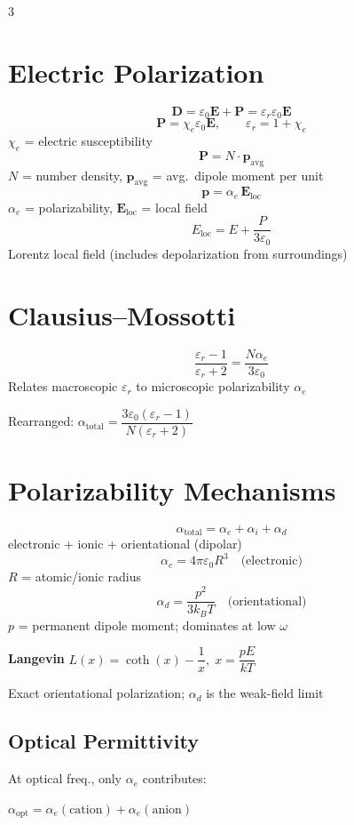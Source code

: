 \documentclass[9pt]{extarticle}
\newcommand{\eqlabel}[1]{\textbf{\scriptsize #1}\;}
\newcommand{\vardef}[1]{{\footnotesize\color{defgray}#1}}
\begin{document}
\begin{multicols}{3}

\section{Electric Polarization}
\[\mathbf{D} = \varepsilon_0\mathbf{E} + \mathbf{P} = \varepsilon_r\varepsilon_0\mathbf{E}\]
\[\mathbf{P} = \chi_e\varepsilon_0\mathbf{E},\qquad \varepsilon_r = 1 + \chi_e\]
\vardef{$\chi_e$ = electric susceptibility}
\[\mathbf{P} = N\cdot\mathbf{p}_{\text{avg}}\]
\vardef{$N$ = number density, $\mathbf{p}_{\text{avg}}$ = avg.\ dipole moment per unit}
\[\mathbf{p} = \alpha_e\,\mathbf{E}_{\text{loc}}\]
\vardef{$\alpha_e$ = polarizability, $\mathbf{E}_{\text{loc}}$ = local field}
\[E_{\text{loc}} = E + \frac{P}{3\varepsilon_0}\]
\vardef{Lorentz local field (includes depolarization from surroundings)}

\section{Clausius--Mossotti}
\[\frac{\varepsilon_r - 1}{\varepsilon_r + 2} = \frac{N\alpha_e}{3\varepsilon_0}\]
\vardef{Relates macroscopic $\varepsilon_r$ to microscopic polarizability $\alpha_e$}

Rearranged: $\alpha_{\text{total}} = \dfrac{3\varepsilon_0(\varepsilon_r - 1)}{N(\varepsilon_r + 2)}$

\section{Polarizability Mechanisms}
\[\alpha_{\text{total}} = \alpha_e + \alpha_i + \alpha_d\]
\vardef{electronic + ionic + orientational (dipolar)}
\[\alpha_e = 4\pi\varepsilon_0 R^3 \quad\text{(electronic)}\]
\vardef{$R$ = atomic/ionic radius}
\[\alpha_d = \frac{p^2}{3k_BT} \quad\text{(orientational)}\]
\vardef{$p$ = permanent dipole moment; dominates at low $\omega$}

\eqlabel{Langevin} $L(x) = \coth(x) - \dfrac{1}{x},\; x = \dfrac{pE}{kT}$

\vardef{Exact orientational polarization; $\alpha_d$ is the weak-field limit}

\subsection{Optical Permittivity}
At optical freq., only $\alpha_e$ contributes:

$\alpha_{\text{opt}} = \alpha_e(\text{cation}) + \alpha_e(\text{anion})$


\end{multicols}
\end{document}
